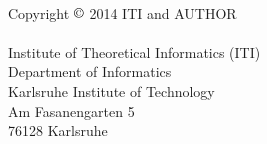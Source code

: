 \thispagestyle{empty}
\ \vfill
\begin{flushleft}
  Copyright \(\copyright\) 2014 ITI and AUTHOR\\ %
  \ \\
  Institute of Theoretical Informatics (ITI)\\
  Department of Informatics\\
  Karlsruhe Institute of Technology\\
  Am Fasanengarten 5\\
  76128 Karlsruhe
\end{flushleft}
\newpage
